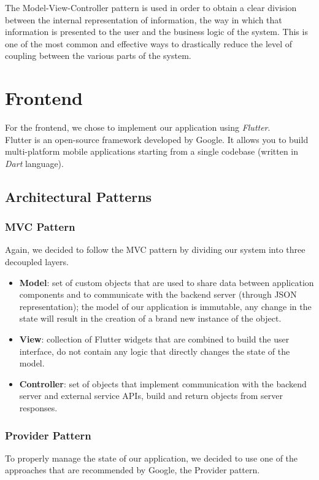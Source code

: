 The Model-View-Controller pattern is used in order to obtain a clear division between the internal representation of information, the way in which that information is presented to the user and the business logic of the system.
This is one of the most common and effective ways to drastically reduce the level of coupling between the various parts of the system.

\section{Frontend}
For the frontend, we chose to implement our application using \emph{Flutter}.\\
Flutter is an open-source framework developed by Google.
It allows you to build multi-platform mobile applications starting from a single codebase (written in \emph{Dart} language).

\subsection{Architectural Patterns}

\subsubsection{MVC Pattern}
Again, we decided to follow the MVC pattern by dividing our system into three decoupled layers.
\begin{itemize}
    \item \textbf{Model}:
          set of custom objects that are used to share data between application components and to communicate with the backend server (through JSON representation);
          the model of our application is immutable, any change in the state will result in the creation of a brand new instance of the object.
    \item \textbf{View}:
          collection of Flutter widgets that are combined to build the user interface, do not contain any logic that directly changes the state of the model.
    \item \textbf{Controller}:
          set of objects that implement communication with the backend server and external service APIs, build and return objects from server responses.
\end{itemize}

\subsubsection{Provider Pattern}
To properly manage the state of our application, we decided to use one of the approaches that are recommended by Google, the Provider pattern.

